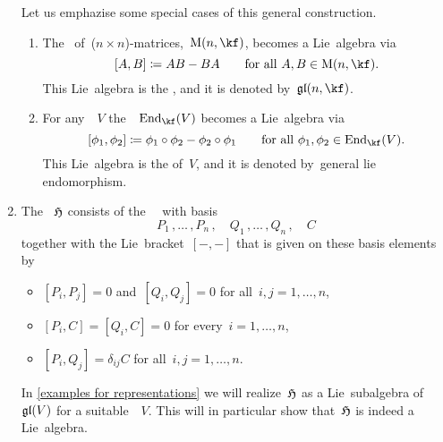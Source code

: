 \begin{examples}
\begin{enumerate}
      Let us emphazise some special cases of this general construction.
      \begin{enumerate}
        \item
          The~{\algebra{$\kf$}} of~($n \times n$)-matrices,~$\Mat(n, \kf)$, becomes a Lie~algebra via
          \[
            [A,B]
            \defined
            AB - BA
            \qquad
            \text{for all~$A, B \in \Mat(n, \kf)$.}
          \]
          This Lie~algebra is the , and it is denoted by~$\gllie(n, \kf)$.
        \item
          For any~{\vectorspace{$\kf$}}~$V$ the~{\algebra{$\kf$}}~$\End_{\kf}(V)$ becomes a Lie~algebra via
          \[
            [\phi_1, \phi_2]
            \defined
            \phi_1 \circ \phi_2 - \phi_2 \circ \phi_1
            \qquad
            \text{for all~$\phi_1, \phi_2 \in \End_{\kf}(V)$.}
          \]
          This Lie~algebra is the  of~$V$, and it is denoted by~\gls*{general lie endomorphism}.
      \end{enumerate}
    \item
      The ~$\mathfrak{H}$ consists of the~~{\vectorspace{$\kf$}} with basis
      \[
        P_1 \,, \dotsc \,, P_n \,,
        \quad
        Q_1 \,, \dotsc \,, Q_n \,,
        \quad
        C
      \]
      together with the Lie~bracket~$[-,-]$ that is given on these basis elements by
      \begin{itemize}
        \item
          $[P_i, P_j] = 0$ and~$[Q_i, Q_j] = 0$ for all~$i, j = 1, \dotsc, n$,
        \item
          $[P_i, C] = [Q_i, C] = 0$ for every~$i = 1, \dotsc, n$,
        \item
          $[P_i, Q_j] = \delta_{ij} C$ for all~$i,j = 1, \dotsc, n$.
      \end{itemize}
      In \cref{examples for representations} we will realize~$\mathfrak{H}$ as a Lie~subalgebra of~$\mathfrak{gl}(V)$ for a suitable~\vectorspace{$\kf$}~$V$.
      This will in particular show that~$\mathfrak{H}$ is indeed a Lie~algebra.
  \end{enumerate}
\end{examples}


